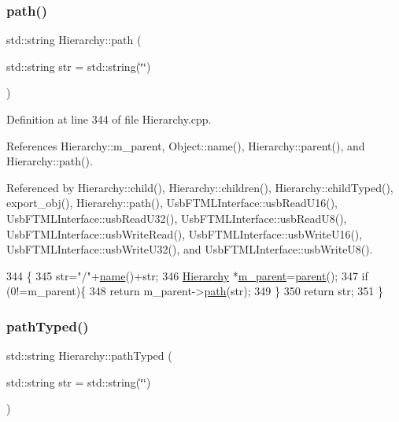 \subsubsection{\texorpdfstring{path()}{path()}}
{\footnotesize\ttfamily std\+::string Hierarchy\+::path (\begin{DoxyParamCaption}\item[{std\+::string}]{str = {\ttfamily std\+:\+:string(\char`\"{}\char`\"{})} }\end{DoxyParamCaption})\hspace{0.3cm}{\ttfamily [inherited]}}



Definition at line 344 of file Hierarchy.\+cpp.



References Hierarchy\+::m\+\_\+parent, Object\+::name(), Hierarchy\+::parent(), and Hierarchy\+::path().



Referenced by Hierarchy\+::child(), Hierarchy\+::children(), Hierarchy\+::child\+Typed(), export\+\_\+obj(), Hierarchy\+::path(), Usb\+F\+T\+M\+L\+Interface\+::usb\+Read\+U16(), Usb\+F\+T\+M\+L\+Interface\+::usb\+Read\+U32(), Usb\+F\+T\+M\+L\+Interface\+::usb\+Read\+U8(), Usb\+F\+T\+M\+L\+Interface\+::usb\+Write\+Read(), Usb\+F\+T\+M\+L\+Interface\+::usb\+Write\+U16(), Usb\+F\+T\+M\+L\+Interface\+::usb\+Write\+U32(), and Usb\+F\+T\+M\+L\+Interface\+::usb\+Write\+U8().


\begin{DoxyCode}
344                                       \{
345   str=\textcolor{stringliteral}{"/"}+\hyperlink{classObject_a300f4c05dd468c7bb8b3c968868443c1}{name}()+str;
346   \hyperlink{classHierarchy}{Hierarchy} *\hyperlink{classHierarchy_a5814bb280d4e8539ab25ab6cbfb9cc4f}{m\_parent}=\hyperlink{classHierarchy_a1c7bec8257e717f9c1465e06ebf845fc}{parent}();
347   \textcolor{keywordflow}{if} (0!=m\_parent)\{
348     \textcolor{keywordflow}{return} m\_parent->\hyperlink{classHierarchy_aa7990fa7caf132d83e361ce033c6c65a}{path}(str);
349   \}
350   \textcolor{keywordflow}{return} str;
351 \}
\end{DoxyCode}
\mbox{\label{classHierarchy_a1efd56cd164d328d2002e53a10a19b8c}} 
\subsubsection{\texorpdfstring{path\+Typed()}{pathTyped()}}
{\footnotesize\ttfamily std\+::string Hierarchy\+::path\+Typed (\begin{DoxyParamCaption}\item[{std\+::string}]{str = {\ttfamily std\+:\+:string(\char`\"{}\char`\"{})} }\end{DoxyParamCaption})\hspace{0.3cm}{\ttfamily [inherited]}}



